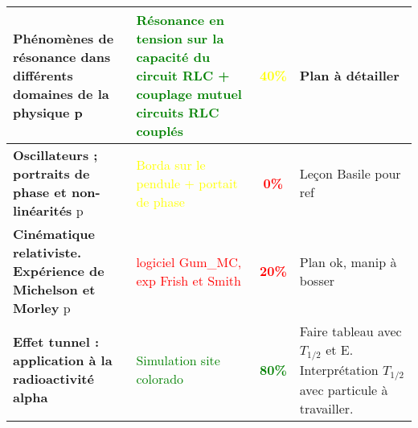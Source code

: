 \begin{changemargin}{-1.5cm}{-0cm}
\begin{center}
\begin{tabularx}{\paperwidth-2cm}{| X | X | c | X |}
  \hline
  \textbf{Phénomènes de résonance dans différents domaines de la physique} p\pageref{LP_resonance} & \textcolor{green}{Résonance en tension sur la capacité du circuit RLC + couplage mutuel circuits RLC couplés} & \textcolor{yellow}{\textbf{40\%}} & Plan à détailler  \\
  \hline
  \textbf{Oscillateurs ; portraits de phase et non-linéarités} p\pageref{LP_PortaitPhase}~& \textcolor{yellow}{Borda sur le pendule + portait de phase} & \textcolor{red}{\textbf{0\%}} & Leçon Basile pour ref  \\
  \hline
  \hline
  \textbf{Cinématique relativiste. Expérience de Michelson et Morley} p\pageref{LP_CinematiqueRelativiste} & \textcolor{red}{logiciel Gum\_MC, exp Frish et Smith} & \textcolor{red}{\textbf{20\%}} & Plan ok, manip à bosser  \\
  \hline
  \textbf{Effet tunnel : application à la radioactivité alpha} & \textcolor{green}{Simulation site colorado}& \textcolor{green}{\textbf{80\%}} & Faire tableau avec $T_{1/2}$ et E. Interprétation $T_{1/2}$ avec particule à travailler. \\
  \hline
\end{tabularx}
\end{center}

\end{changemargin}